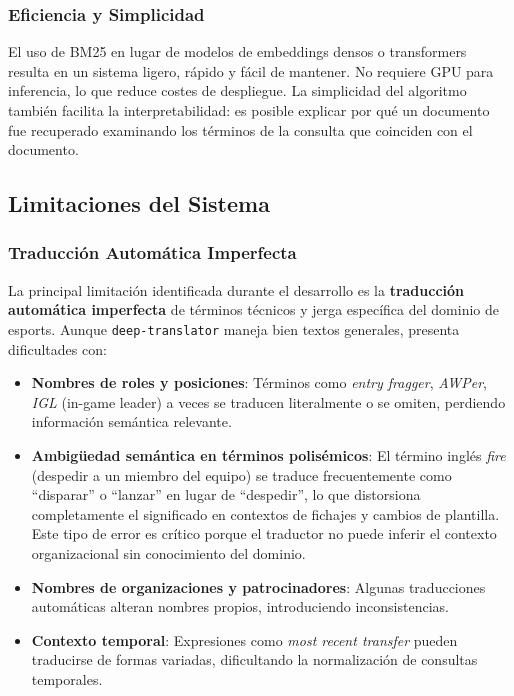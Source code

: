\subsubsection{Eficiencia y Simplicidad}

El uso de BM25 en lugar de modelos de embeddings densos o transformers resulta en un sistema ligero, rápido y fácil de mantener. No requiere GPU para inferencia, lo que reduce costes de despliegue. La simplicidad del algoritmo también facilita la interpretabilidad: es posible explicar por qué un documento fue recuperado examinando los términos de la consulta que coinciden con el documento.

\subsection{Limitaciones del Sistema}

\subsubsection{Traducción Automática Imperfecta}

La principal limitación identificada durante el desarrollo es la \textbf{traducción automática imperfecta} de términos técnicos y jerga específica del dominio de esports. Aunque \texttt{deep-translator} maneja bien textos generales, presenta dificultades con:

\begin{itemize}
    \item \textbf{Nombres de roles y posiciones}: Términos como \textit{entry fragger}, \textit{AWPer}, \textit{IGL} (in-game leader) a veces se traducen literalmente o se omiten, perdiendo información semántica relevante.
    \item \textbf{Ambigüedad semántica en términos polisémicos}: El término inglés \textit{fire} (despedir a un miembro del equipo) se traduce frecuentemente como ``disparar'' o ``lanzar'' en lugar de ``despedir'', lo que distorsiona completamente el significado en contextos de fichajes y cambios de plantilla. Este tipo de error es crítico porque el traductor no puede inferir el contexto organizacional sin conocimiento del dominio.
    \item \textbf{Nombres de organizaciones y patrocinadores}: Algunas traducciones automáticas alteran nombres propios, introduciendo inconsistencias.
    \item \textbf{Contexto temporal}: Expresiones como \textit{most recent transfer} pueden traducirse de formas variadas, dificultando la normalización de consultas temporales.
\end{itemize}

